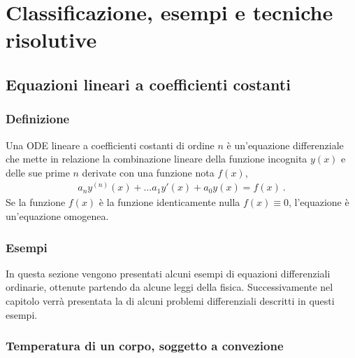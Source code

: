\documentclass[letterpaper,10pt,italian]{jupyterBook}
\begin{document}
\section{Classificazione, esempi e tecniche risolutive}
\label{\detokenize{ch/ode:classificazione-esempi-e-tecniche-risolutive}}\label{\detokenize{ch/ode:ode-hs-types}}

\subsection{Equazioni lineari a coefficienti costanti}
\label{\detokenize{ch/ode:equazioni-lineari-a-coefficienti-costanti}}\label{\detokenize{ch/ode:ode-hs-types-linear-const}}

\subsubsection{Definizione}
\label{\detokenize{ch/ode:definizione}}\label{\detokenize{ch/ode:ode-hs-types-linear-const-def}}
\sphinxAtStartPar
Una ODE lineare a coefficienti costanti di ordine \(n\) è un’equazione differenziale che mette in relazione la combinazione lineare della funzione incognita \(y(x)\) e delle sue prime \(n\) derivate con una funzione nota \(f(x)\),
\begin{equation*}
\begin{split}a_n y^{(n)}(x) + \dots a_1 y'(x) + a_0 y(x) = f(x) \ .\end{split}
\end{equation*}
\sphinxAtStartPar
Se la funzione \(f(x)\) è la funzione identicamente nulla \(f(x) \equiv 0\), l’equazione è un’equazione omogenea.


\subsubsection{Esempi}
\label{\detokenize{ch/ode:esempi}}\label{\detokenize{ch/ode:ode-hs-types-linear-const-ex}}
\sphinxAtStartPar
In questa sezione vengono presentati alcuni esempi di equazioni differenziali ordinarie, ottenute partendo da alcune leggi della fisica. Successivamente nel capitolo verrà presentata la {\hyperref[\detokenize{ch/ode:ode-hs-types-linear-const-ex-sol}]{}} di alcuni problemi differenziali descritti in questi esempi.
\subsubsection*{Temperatura di un corpo, soggetto a convezione}
\end{document}
